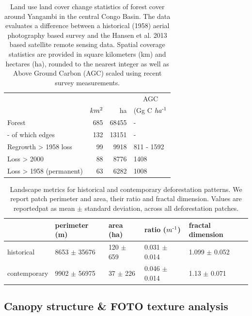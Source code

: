 \documentclass[remote sensing,article,submit,moreauthors,pdftex,10pt,a4paper]{mdpi}
\begin{document}
\begin{table}[!h]

\caption{\label{tab:unnamed-chunk-6}Land use land cover change statistics of forest cover around Yangambi in the central Congo Basin. The data evaluates a difference between a historical (1958) aerial photography based survey and the Hansen et al. 2013 based satellite remote sensing data. Spatial coverage statistics are provided in square kilometers (km) and hectares (ha), rounded to the nearest integer as well as Above Ground Carbon (AGC) scaled using recent survey measurements.}
\centering
\begin{tabular}[t]{lrrl}
\toprule
\multicolumn{3}{c}{ } & \multicolumn{1}{c}{AGC} \\
\cmidrule(l{3pt}r{3pt}){4-4}
  & $km\textsuperscript{2}$ & ha & (Gg C $ha\textsuperscript{-1}$\\
\midrule
Forest & 685 & 68455 & -\\
-  of which edges & 132 & 13151 & -\\
Regrowth > 1958 loss & 99 & 9918 & 811 - 1592\\
Loss > 2000 & 88 & 8776 & 1408\\
Loss > 1958 (permanent) & 63 & 6282 & 1008\\
\bottomrule
\end{tabular}
\end{table}

\begin{table}[!h]

\caption{\label{tab:unnamed-chunk-7}Landscape metrics for historical and contemporary deforestation patterns. We report patch perimeter and area, their ratio and fractal dimension. Values are reportedpat as mean $\pm$ standard deviation, across all deforestation patches.}
\centering
\begin{tabular}[t]{lllll}
\toprule
  & perimeter (m) & area (ha) & ratio ($m\textsuperscript{-1}$) & fractal dimension\\
\midrule
historical & 8653 $\pm$ 35676 & 120 $\pm$ 659 & 0.031 $\pm$ 0.014 & 1.099 $\pm$ 0.052\\
contemporary & 9902 $\pm$ 56975 & 37 $\pm$ 226 & 0.046 $\pm$ 0.014 & 1.13 $\pm$ 0.071\\
\bottomrule
\end{tabular}
\end{table}

\hypertarget{canopy-structure-foto-texture-analysis-1}{%
\subsection{Canopy structure \& FOTO texture
analysis}\label{canopy-structure-foto-texture-analysis-1}}
\end{document}

